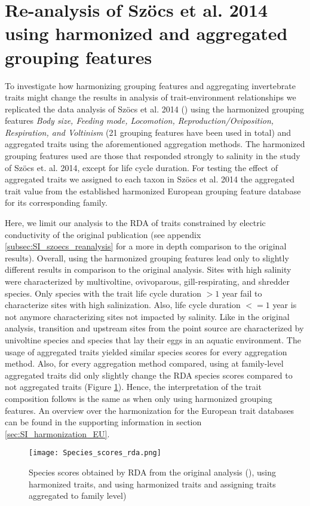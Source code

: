 \documentclass[../Draft_harmonization_paper.tex]{subfiles}
\begin{document}


\section{Re-analysis of Szöcs et al. 2014 using harmonized and aggregated grouping features}

To investigate how harmonizing grouping features and aggregating invertebrate traits might change the results in analysis of trait-environment relationships we replicated the data analysis of Szöcs et al. 2014 (\cite{szocs_effects_2014}) using the harmonized grouping features \textit{Body size, Feeding mode, Locomotion, Reproduction/Oviposition, Respiration, and Voltinism} (21 grouping features have been used in total) and aggregated traits using the aforementioned aggregation methods. The harmonized grouping features used are those that responded strongly to salinity in the study of Szöcs et. al. 2014, except for life cycle duration. %
For testing the effect of aggregated traits we assigned to each taxon in Szöcs et al. 2014 the aggregated trait value from the established harmonized European grouping feature database for its corresponding family.

Here, we limit our analysis to the RDA of traits constrained by electric conductivity of the original publication (see appendix \ref{subsec:SI_szoecs_reanalysis} for a more in depth comparison to the original results). Overall, using the harmonized grouping features lead only to slightly different results in comparison to the original analysis. Sites with high salinity were characterized by multivoltine, ovivoparous, gill-respirating, and shredder species. Only species with the trait life cycle duration $> 1$ year fail to characterize sites with high salinization. Also, life cycle duration $<= 1$ year is not anymore characterizing sites not impacted by salinity. Like in the original analysis, transition and upstream sites from the point source are characterized by univoltine species and species that lay their eggs in an aquatic environment. The usage of aggregated traits yielded similar species scores for every aggregation method. Also, for every aggregation method compared, using at family-level aggregated traits did only slightly change the RDA species scores compared to not aggregated traits (Figure \ref{fig:rda_species_scores}). Hence, the interpretation of the trait composition follows is the same as when only using harmonized grouping features. An overview over the harmonization for the European trait databases can be found in the supporting information in section \ref{sec:SI_harmonization_EU}.


\begin{figure}[H]
    \label{fig:rda_species_scores}
    \centering
    \texttt{[image: Species\_scores\_rda.png]}
    \caption{Species scores obtained by RDA from the original analysis (\cite{szocs_effects_2014}), using harmonized traits, and using harmonized traits and assigning traits aggregated to family level)}
    \label{fig:rda_species_scores}
\end{figure}
\end{document}
